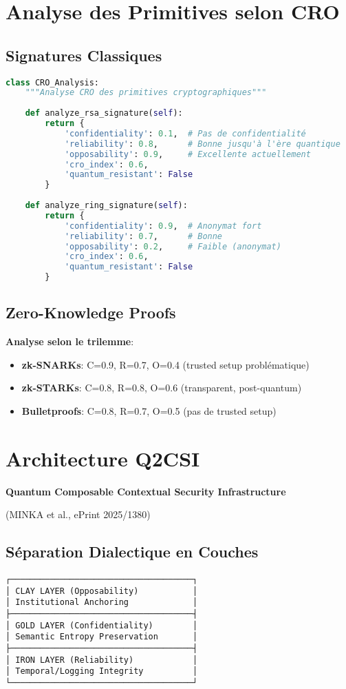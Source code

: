 \section{Analyse des Primitives selon CRO}
\subsection{Signatures Classiques}
\begin{lstlisting}[language=Python, caption=Analyse CRO des primitives cryptographiques]
class CRO_Analysis:
    """Analyse CRO des primitives cryptographiques"""
    
    def analyze_rsa_signature(self):
        return {
            'confidentiality': 0.1,  # Pas de confidentialité
            'reliability': 0.8,      # Bonne jusqu'à l'ère quantique
            'opposability': 0.9,     # Excellente actuellement
            'cro_index': 0.6,
            'quantum_resistant': False
        }
    
    def analyze_ring_signature(self):
        return {
            'confidentiality': 0.9,  # Anonymat fort
            'reliability': 0.7,      # Bonne
            'opposability': 0.2,     # Faible (anonymat)
            'cro_index': 0.6,
            'quantum_resistant': False
        }
\end{lstlisting}

\subsection{Zero-Knowledge Proofs}
\textbf{Analyse selon le trilemme}:

\begin{itemize}
\item \textbf{zk-SNARKs}: C=0.9, R=0.7, O=0.4 (trusted setup problématique)
\item \textbf{zk-STARKs}: C=0.8, R=0.8, O=0.6 (transparent, post-quantum)
\item \textbf{Bulletproofs}: C=0.8, R=0.7, O=0.5 (pas de trusted setup)
\end{itemize}

\section{Architecture Q2CSI}
\textbf{Quantum Composable Contextual Security Infrastructure}

(MINKA et al., ePrint 2025/1380)

\subsection{Séparation Dialectique en Couches}
\begin{verbatim}
┌─────────────────────────────────────┐
│ CLAY LAYER (Opposability)           │
│ Institutional Anchoring             │
├─────────────────────────────────────┤
│ GOLD LAYER (Confidentiality)        │
│ Semantic Entropy Preservation       │
├─────────────────────────────────────┤
│ IRON LAYER (Reliability)            │
│ Temporal/Logging Integrity          │
└─────────────────────────────────────┘
\end{verbatim}

